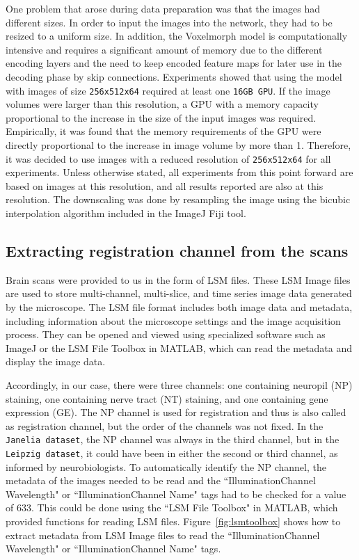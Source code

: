 \documentclass{book}
\begin{document}
	One problem that arose during data preparation was that the images had different sizes. In order to input the images into the network, they had to be resized to a uniform size. In addition, the Voxelmorph model is computationally intensive and requires a significant amount of memory due to the different encoding layers and the need to keep encoded feature maps for later use in the decoding phase by skip connections. Experiments showed that using the model with images of size \texttt{256x512x64} required at least one \texttt{16GB GPU}. If the image volumes were larger than this resolution, a GPU with a memory capacity proportional to the increase in the size of the input images was required. Empirically, it was found that the memory requirements of the GPU were directly proportional to the increase in image volume by more than 1. Therefore, it was decided to use images with a reduced resolution of \texttt{256x512x64} for all experiments. Unless otherwise stated, all experiments from this point forward are based on images at this resolution, and all results reported are also at this resolution. The downscaling was done by resampling the image using the bicubic interpolation algorithm included in the ImageJ Fiji tool.
	
	\subsection{Extracting registration channel from the scans}
	
	Brain scans were provided to us in the form of LSM files. These LSM Image files are used to store multi-channel, multi-slice, and time series image data generated by the microscope. The LSM file format includes both image data and metadata, including information about the microscope settings and the image acquisition process. They can be opened and viewed using specialized software such as ImageJ or the LSM File Toolbox in MATLAB, which can read the metadata and display the image data.
	
	Accordingly, in our case, there were three channels: one containing neuropil (NP) staining, one containing nerve tract (NT) staining, and one containing gene expression (GE). The NP channel is used for registration and thus is also called as registration channel, but the order of the channels was not fixed. In the \texttt{Janelia dataset}, the NP channel was always in the third channel, but in the \texttt{Leipzig dataset}, it could have been in either the second or third channel, as informed by neurobiologists. To automatically identify the NP channel, the metadata of the images needed to be read and the ``IlluminationChannel Wavelength" or ``IlluminationChannel Name" tags had to be checked for a value of 633. This could be done using the ``LSM File Toolbox" in MATLAB, which provided functions for reading LSM files. Figure~\ref{fig:lsmtoolbox} shows how to extract metadata from LSM Image files to read the ``IlluminationChannel Wavelength" or ``IlluminationChannel Name" tags. 
	
\end{document}
